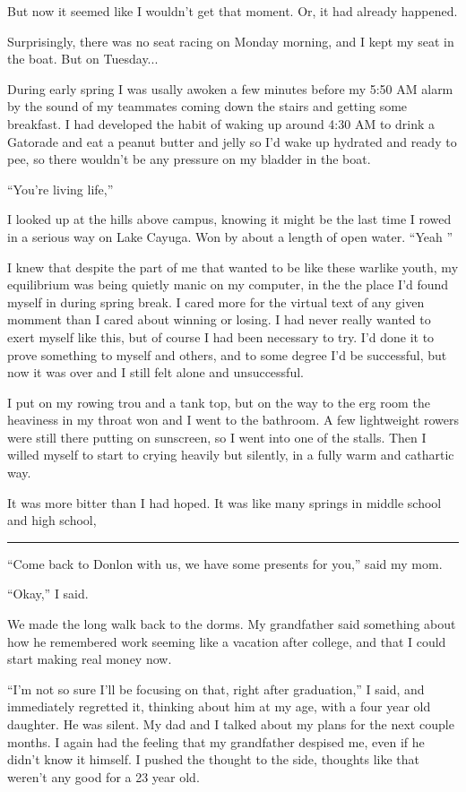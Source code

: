 But now it seemed like I wouldn't get that moment.  Or, it had already happened.

Surprisingly, there was no seat racing on Monday morning, and I kept my seat in
the boat.  But on Tuesday...

During early spring I was usally awoken a few minutes before my 5:50 AM alarm by
the sound of my teammates coming down the stairs and getting some breakfast.  I
had developed the habit of waking up around 4:30 AM to drink a Gatorade and eat
a peanut butter and jelly so I'd wake up hydrated and ready to pee, so there
wouldn't be any pressure on my bladder in the boat. 

``You're living life,''

I looked up at the hills above campus, knowing it might be the last time I rowed
in a serious way on Lake Cayuga.  Won by about a length of open water.  ``Yeah
'' 

I knew that despite the part of me that wanted to be like these warlike youth,
my equilibrium was being quietly manic on my computer, in the the place I'd
found myself in during spring break.  I cared more for the virtual text of any
given momment than I cared about winning or losing.  I had never really wanted
to exert myself like this, but of course I had been necessary to try.  I'd done
it to prove something to myself and others, and to some degree I'd be
successful, but now it was over and I still felt alone and unsuccessful.

I put on my rowing trou and a tank top, but on the way to the erg room the
heaviness in my throat won and I went to the bathroom.  A few lightweight
rowers were still there putting on sunscreen, so I went into one of the stalls.
Then I willed myself to start to crying heavily but silently, in a fully warm
and cathartic way.  

It was more bitter than I had hoped.  It was like many springs in middle school
and high school, 

\plainfancybreak{12pt}{2}{* * *}

``Come back to Donlon with us, we have some presents for you,'' said my mom. 

``Okay,'' I said.  

We made the long walk back to the dorms.  My grandfather said something about
how he remembered work seeming like a vacation after college, and that I could
start making real money now.

``I'm not so sure I'll be focusing on that, right after graduation,'' I said,
and immediately regretted it, thinking about him at my age, with a four year old
daughter.  He was silent.  My dad and I talked about my plans for the next
couple months.  I again had the feeling that my grandfather despised me, even if
he didn't know it himself.  I pushed the thought to the side, thoughts like that
weren't any good for a 23 year old.

